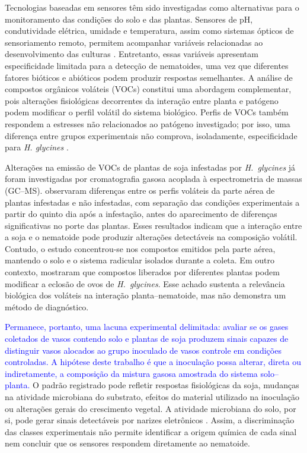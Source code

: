 Tecnologias baseadas em sensores têm sido investigadas como alternativas para o monitoramento das condições do solo e das plantas. Sensores de pH, condutividade elétrica, umidade e temperatura, assim como sistemas ópticos de sensoriamento remoto, permitem acompanhar variáveis relacionadas ao desenvolvimento das culturas \cite{santos2022}. Entretanto, essas variáveis apresentam especificidade limitada para a detecção de nematoides, uma vez que diferentes fatores bióticos e abióticos podem produzir respostas semelhantes. A análise de compostos orgânicos voláteis (VOCs) constitui uma abordagem complementar, pois alterações fisiológicas decorrentes da interação entre planta e patógeno podem modificar o perfil volátil do sistema biológico. Perfis de VOCs também respondem a estresses não relacionados ao patógeno investigado; por isso, uma diferença entre grupos experimentais não comprova, isoladamente, especificidade para \textit{H. glycines} \cite{gan2023}.

Alterações na emissão de VOCs de plantas de soja infestadas por \textit{H.~glycines} já foram investigadas por cromatografia gasosa acoplada à espectrometria de massas (GC--MS). \citet{constantino2021} observaram diferenças entre os perfis voláteis da parte aérea de plantas infestadas e não infestadas, com separação das condições experimentais a partir do quinto dia após a infestação, antes do aparecimento de diferenças significativas no porte das plantas. Esses resultados indicam que a interação entre a soja e o nematoide pode produzir alterações detectáveis na composição volátil. Contudo, o estudo concentrou-se nos compostos emitidos pela parte aérea, mantendo o solo e o sistema radicular isolados durante a coleta. Em outro contexto, \citet{velloso2021} mostraram que compostos liberados por diferentes plantas podem modificar a eclosão de ovos de \textit{H.~glycines}. Esse achado sustenta a relevância biológica dos voláteis na interação planta--nematoide, mas não demonstra um método de diagnóstico.

\textcolor{blue}{Permanece, portanto, uma lacuna experimental delimitada: avaliar se os gases coletados de vasos contendo solo e plantas de soja produzem sinais capazes de distinguir vasos alocados ao grupo inoculado de vasos controle em condições controladas. A hipótese deste trabalho é que a inoculação possa alterar, direta ou indiretamente, a composição da mistura gasosa amostrada do sistema solo--planta.} O padrão registrado pode refletir respostas fisiológicas da soja, mudanças na atividade microbiana do substrato, efeitos do material utilizado na inoculação ou alterações gerais do crescimento vegetal. A atividade microbiana do solo, por si, pode gerar sinais detectáveis por narizes eletrônicos \cite{decesare2011}. Assim, a discriminação das classes experimentais não permite identificar a origem química de cada sinal nem concluir que os sensores respondem diretamente ao nematoide.


